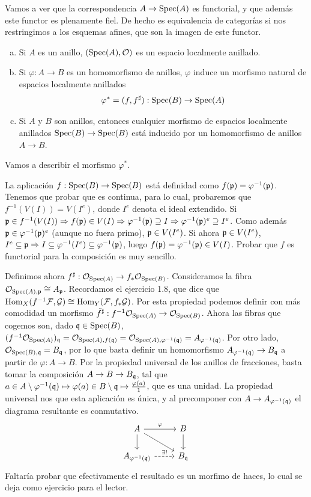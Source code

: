 \documentclass[GA.tex]{subfiles}
\begin{document}
Vamos a ver que la correspondencia $A\to\operatorname{Spec}(A)$ es functorial, y que además este functor es plenamente fiel. De hecho es equivalencia de categorías si nos restringimos a los esquemas afines, que son la imagen de este functor. 
\begin{prop}\label{inducido}
\begin{enumerate}[(a)]
\item Si $A$ es un anillo, $(\operatorname{Spec}(A), {\mathcal O})$ es un espacio localmente anillado.
\item Si $\varphi:A\to B$ es un homomorfismo de anillos, $\varphi$ induce un morfismo natural de espacios localmente anillados
\[
\varphi^*=(f,f^\sharp):\operatorname{Spec}(B)\to\operatorname{Spec}(A)
\]
\item Si $A$ y $B$ son anillos, entonces cualquier morfismo de espacios localmente anillados $\operatorname{Spec}(B)\to\operatorname{Spec}(B)$ está inducido por un homomorfismo de anillos $A\to B$. 
\end{enumerate}
\end{prop}
\begin{dem}
Vamos a describir el morfismo $\varphi^*$. 

La aplicación $f:\operatorname{Spec}(B)\to\operatorname{Spec}(B)$ está definidad como $f({\mathfrak{p}})=\varphi^{-1}({\mathfrak{p}})$. Tenemos que probar que es continua, para lo cual, probaremos que $f^{-1}(V(I))=V(I^e)$, donde $I^e$ denota el ideal extendido. Si ${\mathfrak{p}}\in f^{-1}(V(I))\Rightarrow f({\mathfrak{p}})\in V(I)\Rightarrow \varphi^{-1}({\mathfrak{p}})\supseteq I\Rightarrow \varphi^{-1}({\mathfrak{p}})^e\supseteq I^e$. Como además ${\mathfrak{p}}\in\varphi^{-1}({\mathfrak{p}})^e$ (aunque no fuera primo), ${\mathfrak{p}}\in V(I^e)$. Si ahora ${\mathfrak{p}}\in V(I^e)$, $I^e\subseteq{\mathfrak{p}}\Rightarrow I\subseteq \varphi^{-1}(I^e)\subseteq \varphi^{-1}({\mathfrak{p}})$, luego $f({\mathfrak{p}})=\varphi^{-1}({\mathfrak{p}})\in V(I)$. Probar que $f$ es functorial para la composición es muy sencillo.

Definimos ahora $f^\sharp:{\mathcal O}_{\operatorname{Spec}(A)}\to f_*{\mathcal O}_{\operatorname{Spec}(B)}$. Consideramos la fibra ${\mathcal O}_{\operatorname{Spec}(A),{\mathfrak{p}}}\cong A_{{\mathfrak{p}}}$. Recordamos el ejercicio 1.8, que dice que $\operatorname{Hom}_X(f^{-1}\mathcal{F},\mathcal{G})\cong\operatorname{Hom}_Y(\mathcal{F}, f_*\mathcal{G})$. Por esta propiedad podemos definir con más comodidad un morfismo $\tilde{f}^\sharp:f^{-1}{\mathcal O}_{\operatorname{Spec}(A)}\to {\mathcal O}_{\operatorname{Spec}(B)}$. Ahora las fibras que cogemos son, dado ${\mathfrak{q}}\in\operatorname{Spec}(B)$, $(f^{-1}{\mathcal O}_{\operatorname{Spec}(A)})_{{\mathfrak{q}}}={\mathcal O}_{\operatorname{Spec}(A), f({\mathfrak{q}})}={\mathcal O}_{\operatorname{Spec}(A), \varphi^{-1}({\mathfrak{q}})}=A_{\varphi^{-1}({\mathfrak{q}})}$. Por otro lado, ${\mathcal O}_{\operatorname{Spec}(B),{\mathfrak{q}}}=B_{{\mathfrak{q}}}$, por lo que basta definir un homomorfismo $A_{\varphi^{-1}({\mathfrak{q}})}\to B_{{\mathfrak{q}}}$ a partir de $\varphi:A\to B$. Por la propiedad universal de los anillos de fracciones, basta tomar la composición $A\to B\to B_{{\mathfrak{q}}}$, tal que $a\in A\setminus\varphi^{-1}({\mathfrak{q}})\mapsto\varphi(a)\in B\setminus{\mathfrak{q}}\mapsto \frac{\varphi(a)}{1}$, que es una unidad. La propiedad universal nos que esta aplicación es única, y al precomponer con $A\to A_{\varphi^{-1}({\mathfrak{q}})}$ el diagrama resultante es conmutativo. 
\[
\begin{tikzcd}
A\arrow[r,"\varphi"] \arrow[dr]\arrow[d] & B\arrow[d]\\
A_{\varphi^{-1}(\q)}\arrow[r, dashed, "\exists!"] & B_{\q}
\end{tikzcd}
\]
Faltaría probar que efectivamente el resultado es un morfimo de haces, lo cual se deja como ejercicio para el lector. 


\end{dem}
\end{document}

